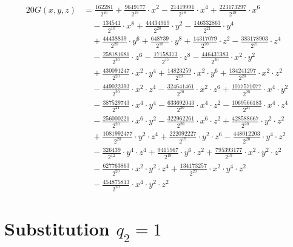 \begin{align*}20G(x,y,z)&=\frac{162281}{2^{16}}+\frac{9649177}{2^{19}}\cdot x^{2}-\frac{21419991}{2^{18}}\cdot x^{4}+\frac{223173297}{2^{19}}\cdot x^{6}\\
&\quad -\frac{134541}{2^{10}}\cdot x^{8}+\frac{44434919}{2^{20}}\cdot y^{2}-\frac{146332863}{2^{21}}\cdot y^{4}\\
&\quad +\frac{44438839}{2^{20}}\cdot y^{6}+\frac{648739}{2^{18}}\cdot y^{8}+\frac{14317079}{2^{20}}\cdot z^{2}-\frac{383178903}{2^{21}}\cdot z^{4}\\
&\quad -\frac{258181681}{2^{20}}\cdot z^{6}-\frac{17158373}{2^{17}}\cdot z^{8}-\frac{446437383}{2^{20}}\cdot x^{2}\cdot y^{2}\\
&\quad +\frac{430091247}{2^{20}}\cdot x^{2}\cdot y^{4}+\frac{14823259}{2^{20}}\cdot x^{2}\cdot y^{6}+\frac{134241297}{2^{20}}\cdot x^{2}\cdot z^{2}\\
&\quad -\frac{449022393}{2^{20}}\cdot x^{2}\cdot z^{4}-\frac{324641461}{2^{20}}\cdot x^{2}\cdot z^{6}+\frac{1077571077}{2^{20}}\cdot x^{4}\cdot y^{2}\\
&\quad -\frac{387529743}{2^{21}}\cdot x^{4}\cdot y^{4}-\frac{633692043}{2^{20}}\cdot x^{4}\cdot z^{2}-\frac{1069566183}{2^{21}}\cdot x^{4}\cdot z^{4}\\
&\quad -\frac{256000221}{2^{20}}\cdot x^{6}\cdot y^{2}-\frac{322962261}{2^{20}}\cdot x^{6}\cdot z^{2}+\frac{428588667}{2^{20}}\cdot y^{2}\cdot z^{2}\\
&\quad +\frac{1081992477}{2^{20}}\cdot y^{2}\cdot z^{4}+\frac{222092227}{2^{19}}\cdot y^{2}\cdot z^{6}-\frac{448012203}{2^{20}}\cdot y^{4}\cdot z^{2}\\
&\quad -\frac{326439}{2^{12}}\cdot y^{4}\cdot z^{4}+\frac{9415967}{2^{19}}\cdot y^{6}\cdot z^{2}+\frac{795393177}{2^{19}}\cdot x^{2}\cdot y^{2}\cdot z^{2}\\
&\quad -\frac{627763863}{2^{20}}\cdot x^{2}\cdot y^{2}\cdot z^{4}+\frac{134173257}{2^{20}}\cdot x^{2}\cdot y^{4}\cdot z^{2}\\
&\quad -\frac{454875813}{2^{20}}\cdot x^{4}\cdot y^{2}\cdot z^{2}\end{align*}\section{Substitution $q_2=1$}
